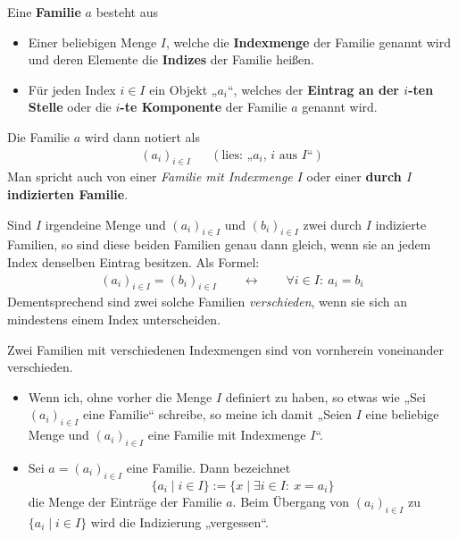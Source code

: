 \begin{defin}[Familien] \label{def:familie}   
    Eine \textbf{Familie} $a$ besteht aus
    \begin{itemize}
        \item Einer beliebigen Menge $I$, welche die \textbf{Indexmenge} der Familie genannt wird und deren Elemente die \textbf{Indizes} der Familie heißen.
        \item Für jeden Index $i\in I$ ein Objekt „$a_i$“, welches der \textbf{Eintrag an der $i$-ten Stelle} oder die \textbf{$i$-te Komponente} der Familie $a$ genannt wird.
    \end{itemize}
    Die Familie $a$ wird dann notiert als
    \begin{align*}
        (a_i)_{i\in I} && (\text{lies: „$a_i$, $i$ aus $I$“})
    \end{align*}
    Man spricht auch von einer \emph{Familie mit Indexmenge $I$} oder einer \textbf{durch $I$ indizierten Familie}.
\end{defin}


\begin{axiom} \label{familiengleich}
    Sind $I$ irgendeine Menge und $(a_i)_{i\in I}$ und $(b_i)_{i\in I}$ zwei durch $I$ indizierte Familien, so sind diese beiden Familien genau dann gleich, wenn sie an jedem Index denselben Eintrag besitzen. Als Formel:
    \begin{align*}
        (a_i)_{i\in I}=(b_i)_{i\in I} \qquad\leftrightarrow\qquad \forall i\in I:\ a_i=b_i
    \end{align*}
    Dementsprechend sind zwei solche Familien \emph{verschieden}, wenn sie sich an mindestens einem Index unterscheiden.
    
    Zwei Familien mit verschiedenen Indexmengen sind von vornherein voneinander verschieden.
\end{axiom}


\begin{nota} \label{mengeeinerfamilie} \quad
    \begin{itemize}
        \item Wenn ich, ohne vorher die Menge $I$ definiert zu haben, so etwas wie „Sei $(a_i)_{i\in I}$ eine Familie“ schreibe, so meine ich damit „Seien $I$ eine beliebige Menge und $(a_i)_{i\in I}$ eine Familie mit Indexmenge $I$“.
        \item Sei $a=(a_i)_{i\in I}$ eine Familie. Dann bezeichnet
            \[ \{a_i \mid i\in I\} := \{x\mid \exists i\in I:\ x=a_i \} \]
        die Menge der Einträge der Familie $a$. Beim Übergang von $(a_i)_{i\in I}$ zu $\{a_i\mid i\in I\}$ wird die Indizierung „vergessen“.
    \end{itemize}
\end{nota}


